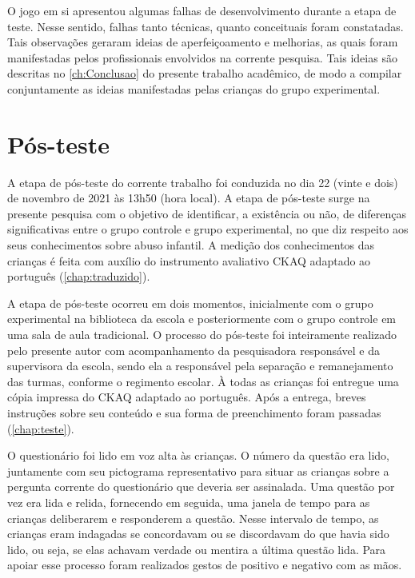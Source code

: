 O jogo em si apresentou algumas falhas de desenvolvimento durante a etapa de teste. Nesse sentido, falhas tanto técnicas, quanto conceituais foram constatadas. Tais observações geraram ideias de aperfeiçoamento e melhorias, as quais foram manifestadas pelos profissionais envolvidos na corrente pesquisa. Tais ideias são descritas no \autoref{ch:Conclusao} do presente trabalho acadêmico, de modo a compilar conjuntamente as ideias manifestadas pelas crianças do grupo experimental. 

 
\section{Pós-teste}\label{sec:postes}

A etapa de pós-teste do corrente trabalho foi conduzida no dia 22 (vinte e dois) de novembro de 2021 às 13h50 (hora local). A etapa de pós-teste surge na presente pesquisa com o objetivo de identificar, a existência ou não, de diferenças significativas entre o grupo controle e grupo experimental, no que diz respeito aos seus conhecimentos sobre abuso infantil. A medição dos conhecimentos das crianças é feita com auxílio do instrumento avaliativo \acf{CKAQ} adaptado ao português (\autoref{chap:traduzido}). 

A etapa de pós-teste ocorreu em dois momentos, inicialmente com o grupo experimental na biblioteca da escola e posteriormente com o grupo controle em uma sala de aula tradicional. O processo do pós-teste foi inteiramente realizado pelo presente autor com acompanhamento da pesquisadora responsável %
e da supervisora %
da escola, sendo ela a responsável pela separação e remanejamento das turmas, conforme o regimento escolar. À todas as crianças foi entregue uma cópia impressa do \ac{CKAQ} adaptado ao português. Após a entrega, breves instruções sobre seu conteúdo e sua forma de preenchimento foram passadas (\autoref{chap:teste}).

O questionário foi lido em voz alta às crianças. O número da questão era lido, juntamente com seu pictograma representativo para situar as crianças sobre a pergunta corrente do questionário que deveria ser assinalada. Uma questão por vez era lida e relida, fornecendo em seguida, uma janela de tempo para as crianças deliberarem e responderem a questão. Nesse intervalo de tempo, as crianças eram indagadas se concordavam ou se discordavam do que havia sido lido, ou seja, se elas achavam verdade ou mentira a última questão lida. Para apoiar esse processo foram realizados gestos de positivo e negativo com as mãos.

